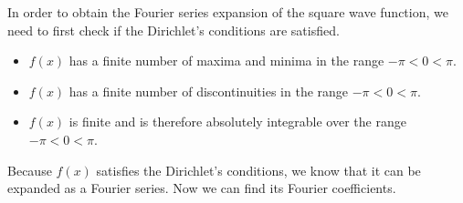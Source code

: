         In order to obtain the Fourier series expansion of the square wave function, we need to first check if the Dirichlet's conditions are satisfied.
        \begin{itemize}
            \item $f(x)$ has a finite number of maxima and minima in the range $-\pi<0<\pi$.
            \item $f(x)$ has a finite number of discontinuities in the range $-\pi<0<\pi$.
            \item $f(x)$ is finite and is therefore absolutely integrable over the range $-\pi<0<\pi$.
        \end{itemize}
        Because $f(x)$ satisfies the Dirichlet's conditions, we know that it can be expanded as a Fourier series. Now we can find its Fourier coefficients.

